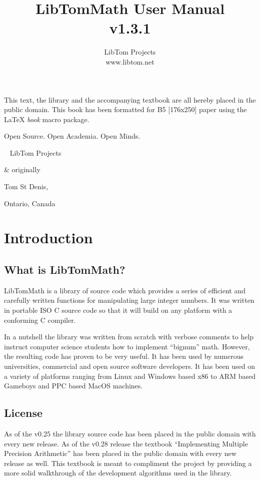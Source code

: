 \documentclass[synpaper]{book}
\begin{document}
\frontmatter
\pagestyle{empty}
\title{LibTomMath User Manual \\ v1.3.1}
\author{LibTom Projects \\ www.libtom.net}
\maketitle
This text, the library and the accompanying textbook are all hereby placed in the public domain.  This book has been
formatted for B5 [176x250] paper using the \LaTeX{} {\em book} macro package.

\vspace{10cm}

\begin{flushright}Open Source.  Open Academia.  Open Minds.

\mbox{ }
LibTom Projects

\& originally

Tom St Denis,

Ontario, Canada
\end{flushright}

\tableofcontents
\listoffigures
\mainmatter
\pagestyle{headings}
\chapter{Introduction}
\section{What is LibTomMath?}
LibTomMath is a library of source code which provides a series of efficient and carefully written functions for manipulating
large integer numbers.  It was written in portable ISO C source code so that it will build on any platform with a conforming
C compiler.

In a nutshell the library was written from scratch with verbose comments to help instruct computer science students how
to implement ``bignum'' math.  However, the resulting code has proven to be very useful.  It has been used by numerous
universities, commercial and open source software developers.  It has been used on a variety of platforms ranging from
Linux and Windows based x86 to ARM based Gameboys and PPC based MacOS machines.

\section{License}
As of the v0.25 the library source code has been placed in the public domain with every new release.  As of the v0.28
release the textbook ``Implementing Multiple Precision Arithmetic'' has been placed in the public domain with every new
release as well.  This textbook is meant to compliment the project by providing a more solid walkthrough of the development
algorithms used in the library.
\end{document}
